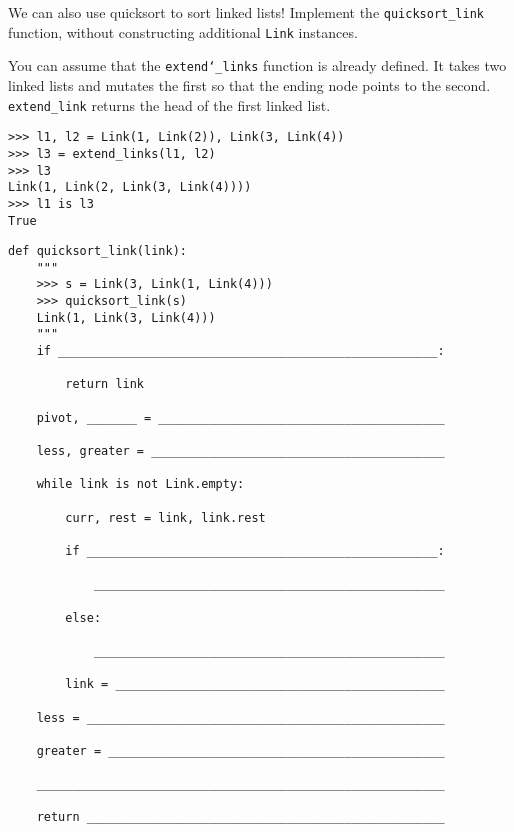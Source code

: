 \question We can also use quicksort to sort linked lists! Implement the
\texttt{quicksort\_link} function, without constructing additional \texttt{Link}
instances.

You can assume that the \texttt{extend\char`_links} function is already defined. It
takes two linked lists and mutates the first so that the ending node points to the second. \texttt{extend\_link} returns the head of the first linked list.

\begin{lstlisting}
>>> l1, l2 = Link(1, Link(2)), Link(3, Link(4))
>>> l3 = extend_links(l1, l2)
>>> l3
Link(1, Link(2, Link(3, Link(4))))
>>> l1 is l3
True
\end{lstlisting}

\begin{lstlisting}
def quicksort_link(link):
    """
    >>> s = Link(3, Link(1, Link(4)))
    >>> quicksort_link(s)
    Link(1, Link(3, Link(4)))
    """
    if _____________________________________________________:

        return link

    pivot, _______ = ________________________________________

    less, greater = _________________________________________

    while link is not Link.empty:

        curr, rest = link, link.rest

        if _________________________________________________:

            _________________________________________________

        else:

            _________________________________________________

        link = ______________________________________________

    less = __________________________________________________

    greater = _______________________________________________

    _________________________________________________________

    return __________________________________________________
\end{lstlisting}

